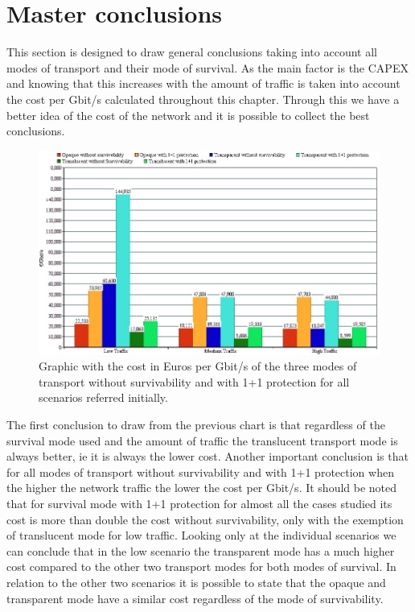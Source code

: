 \clearpage

\section{Master conclusions}

This section is designed to draw general conclusions taking into account all modes of transport and their mode of survival. As the main factor is the CAPEX and knowing that this increases with the amount of traffic is taken into account the cost per Gbit/s calculated throughout this chapter. Through this we have a better idea of the cost of the network and it is possible to collect the best conclusions.

\begin{figure}[h!]
\centering
\includegraphics[width=\textwidth]{sdf/ilp/figures/comparative_image}
\caption{Graphic with the cost in Euros per Gbit/s of the three modes of transport without survivability and with 1+1 protection for all scenarios referred initially.}
\label{graphic_comparative}
\end{figure}

The first conclusion to draw from the previous chart is that regardless of the survival mode used and the amount of traffic the translucent transport mode is always better, ie it is always the lower cost.
Another important conclusion is that for all modes of transport without survivability and with 1+1 protection when the higher the network traffic the lower the cost per Gbit/s.
It should be noted that for survival mode with 1+1 protection for almost all the cases studied its cost is more than double the cost without survivability, only with the exemption of translucent mode for low traffic.
Looking only at the individual scenarios we can conclude that in the low scenario the transparent mode has a much higher cost compared to the other two transport modes for both modes of survival.
In relation to the other two scenarios it is possible to state that the opaque and transparent mode have a similar cost regardless of the mode of survivability.\\

